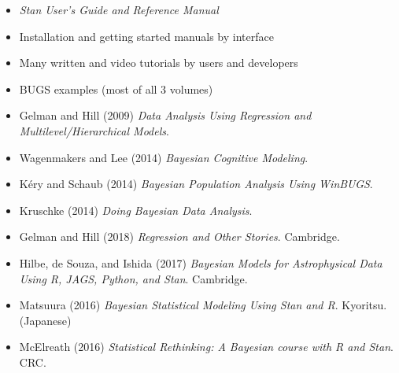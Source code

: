 \documentclass[10pt]{report}
\begin{document}
%
\begin{itemize}
\item {\slshape Stan User's Guide and Reference Manual}
\item Installation and getting started manuals by interface
\item Many written and video tutorials by users and developers
\end{itemize}


%
\begin{itemize}
\item BUGS examples (most of all 3 volumes)
\item Gelman and Hill (2009) {\slshape Data Analysis Using Regression and
    Multilevel/Hierarchical Models}.
\item Wagenmakers and Lee (2014) {\slshape Bayesian Cognitive
    Modeling}.
\item K\'ery and Schaub (2014) {\slshape Bayesian Population Analysis
    Using WinBUGS}.
\item Kruschke (2014) {\slshape Doing Bayesian Data Analysis}.
\end{itemize}


%
\begin{itemize}
\item Gelman and Hill (2018) {\slshape Regression and Other Stories}. Cambridge.
\item Hilbe, de Souza, and Ishida (2017) {\slshape Bayesian Models for Astrophysical Data Using R, JAGS, Python, and Stan}. Cambridge.
\item Matsuura (2016) {\slshape Bayesian Statistical Modeling Using Stan and R}. Kyoritsu. (Japanese)
\item McElreath (2016) {\slshape Statistical Rethinking: A Bayesian course
    with R and Stan}. CRC.
\end{itemize}
\end{document}
